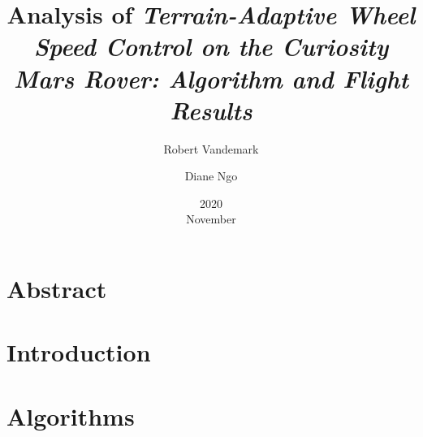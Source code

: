 \documentclass[11pt]{report}
\title{Analysis of \em{Terrain-Adaptive Wheel Speed Control on the Curiosity Mars Rover: Algorithm and Flight Results}}
\date{2020\\ November}
\author{Robert Vandemark \and Diane Ngo}
\begin{document}
	\renewcommand*{\thepage}{\arabic{page}}
	\setcounter{page}{1}
	\maketitle

	\tableofcontents
	\newpage

	\acresetall
	\chapter{Abstract}
	

	\acresetall
	\chapter{Introduction}
	

	\acresetall
	\chapter{Algorithms}
	

	\begin{center}
		\printbibliography[heading=bibintoc, title={Bibliography}]
	\end{center}
\end{document}
